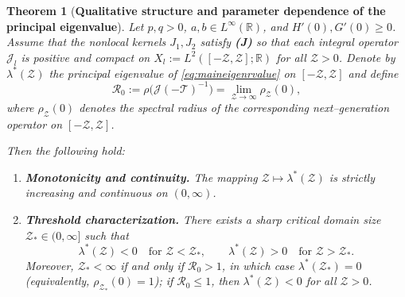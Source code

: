 \documentclass[a4paper,11pt]{amsart}
\newtheorem{theorem}{Theorem}
\theoremstyle{definition}
\numberwithin{equation}{section}
\theoremstyle{definition}
\begin{document}
\begin{theorem}[\textbf{Qualitative structure and parameter dependence of the principal eigenvalue}]\label{thm:eigen-properties}
Let $p,q>0$, $a,b\in L^\infty(\mathbb R)$, and $H'(0),G'(0)\geq 0$.
Assume that the nonlocal kernels $J_1,J_2$ satisfy \textnormal{\textbf{(J)}} so that each integral operator
$\mathscr J_l$ is positive and compact on $X_l:=L^2([-\mathcal Z,\mathcal Z];\mathbb R)$ for all $\mathcal Z>0$.
Denote by $\lambda^\ast(\mathcal Z)$ the principal eigenvalue of \eqref{eq:maineigenrvalue} on $[-\mathcal Z,\mathcal Z]$ and define
\[
\mathcal R_0:=\rho\!\big(\mathscr J(-\mathscr T)^{-1}\big)
   =\lim_{\mathcal Z\to\infty}\rho_{\mathcal Z}(0),
\]
where $\rho_{\mathcal Z}(0)$ denotes the spectral radius of the corresponding next–generation operator on $[-\mathcal Z,\mathcal Z]$.

Then the following hold:
\begin{enumerate}[label=(\roman*),wide,labelwidth=!,labelindent=0pt]

\item \textbf{Monotonicity and continuity.}
The mapping $\mathcal Z\mapsto\lambda^\ast(\mathcal Z)$ is strictly increasing and continuous on $(0,\infty)$.

\medskip
\item \textbf{Threshold characterization.}
There exists a sharp critical domain size $\mathcal Z_\ast\in(0,\infty]$ such that
\[
\lambda^\ast(\mathcal Z)<0 \quad\text{for } \mathcal Z<\mathcal Z_\ast,
\qquad
\lambda^\ast(\mathcal Z)>0 \quad\text{for } \mathcal Z>\mathcal Z_\ast.
\]
Moreover, $\mathcal Z_\ast<\infty$ if and only if $\mathcal R_0>1$, in which case
$\lambda^\ast(\mathcal Z_\ast)=0$ (equivalently, $\rho_{\mathcal Z_\ast}(0)=1$);
if $\mathcal R_0\le1$, then $\lambda^\ast(\mathcal Z)<0$ for all $\mathcal Z>0$.


\end{enumerate}
\end{theorem}
\end{document}
